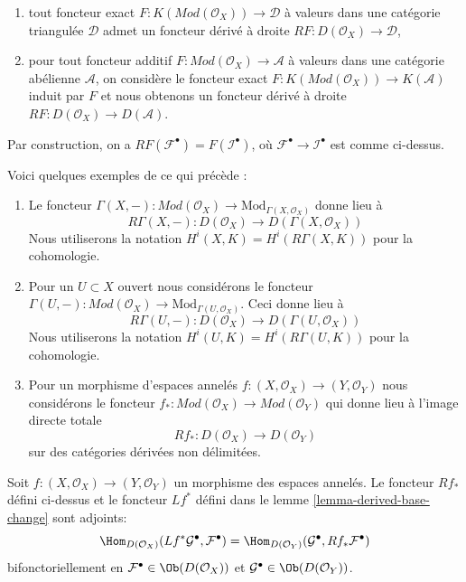 {\begin{enumerate}

\item tout foncteur exact $F : K(\textit{Mod}(\mathcal{O}_X)) \to \mathcal{D}$
à valeurs dans une catégorie triangulée $\mathcal{D}$ admet un foncteur dérivé à droite
$RF : D(\mathcal{O}_X) \to \mathcal{D}$,
\item pour tout foncteur additif
$F : \textit{Mod}(\mathcal{O}_X) \to \mathcal{A}$
à valeurs dans une catégorie abélienne $\mathcal{A}$, on considère le foncteur exact
$F : K(\textit{Mod}(\mathcal{O}_X)) \to K(\mathcal{A})$ induit par $F$
et nous obtenons un foncteur dérivé à droite
$RF : D(\mathcal{O}_X) \to D(\mathcal{A})$.

\end{enumerate}

Par construction, on a $RF(\mathcal{F}^\bullet) = F(\mathcal{I}^\bullet)$,
où $\mathcal{F}^\bullet \to \mathcal{I}^\bullet$ est comme ci-dessus.

\medskip\noindent
Voici quelques exemples de ce qui précède :
\begin{enumerate}
\item Le foncteur $\Gamma(X, -) : \textit{Mod}(\mathcal{O}_X) \to
\text{Mod}_{\Gamma(X, \mathcal{O}_X)}$ donne lieu à $$
R\Gamma(X, -) : D(\mathcal{O}_X) \to D(\Gamma(X, \mathcal{O}_X))
$$ Nous utiliserons la notation $H^i(X, K) = H^i(R\Gamma(X, K))$ pour la cohomologie.
\item Pour un $U \subset X$ ouvert nous considérons le foncteur $\Gamma(U, -) : \textit{Mod}(\mathcal{O}_X) \to
\text{Mod}_{\Gamma(U, \mathcal{O}_X)}$. Ceci donne lieu à $$
R\Gamma(U, -) : D(\mathcal{O}_X) \to D(\Gamma(U, \mathcal{O}_X))
$$ Nous utiliserons la notation $H^i(U, K) = H^i(R\Gamma(U, K))$ pour la cohomologie.
\item Pour un morphisme d'espaces annelés $f : (X, \mathcal{O}_X) \to (Y, \mathcal{O}_Y)$ nous considérons le foncteur $f_* : \textit{Mod}(\mathcal{O}_X) \to \textit{Mod}(\mathcal{O}_Y)$ qui donne lieu à l'image directe totale $$
Rf_* : D(\mathcal{O}_X) \longrightarrow D(\mathcal{O}_Y)
$$ sur des catégories dérivées non délimitées.
\end{enumerate}

\begin{lemma}

\label{lemma-adjoint}
Soit $f : (X, \mathcal{O}_X) \to (Y, \mathcal{O}_Y)$ un morphisme des espaces annelés. Le foncteur $Rf_*$ défini ci-dessus et le foncteur $Lf^*$ défini dans le lemme \ref{lemma-derived-base-change} sont adjoints: $$
\Hom_{D(\mathcal{O}_X)}(Lf^*\mathcal{G}^\bullet, \mathcal{F}^\bullet)
=
\Hom_{D(\mathcal{O}_Y)}(\mathcal{G}^\bullet, Rf_*\mathcal{F}^\bullet)
$$ bifonctoriellement en $\mathcal{F}^\bullet \in \Ob(D(\mathcal{O}_X))$ et $\mathcal{G}^\bullet \in \Ob(D(\mathcal{O}_Y))$.
\end{lemma}

}
